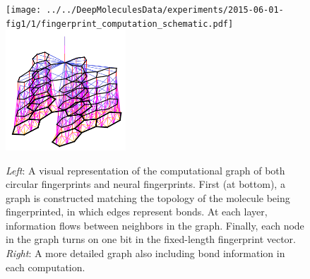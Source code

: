 \documentclass{article}
\begin{document}
\begin{figure}
\centerline{\texttt{[image: ../../DeepMoleculesData/experiments/2015-06-01-fig1/1/fingerprint\_computation\_schematic.pdf]}
\hspace{2em}
\includegraphics[width=0.4\textwidth, clip, trim=4mm 4mm 4mm 8mm]{figures/3d-nets/net1}
}
\caption{\emph{Left}: A visual representation of the computational graph of both circular fingerprints and neural fingerprints.
First (at bottom), a graph is constructed matching the topology of the molecule being fingerprinted, in which edges represent bonds.
At each layer, information flows between neighbors in the graph.
Finally, each node in the graph turns on one bit in the fixed-length fingerprint vector.
\emph{Right}: A more detailed graph also including bond information in each computation.}
\label{fig:architecture sketch}
\end{figure}
\end{document}
